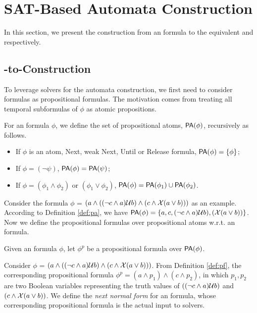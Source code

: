 \section{SAT-Based Automata Construction}\label{sec:main}

In this section, we present the construction from an \ltlf formula to the equivalent \NFA and \DFA respectively. 


\subsection{\ltlf-to-\NFA Construction}

To leverage \SAT solvers for the automata construction, we first need to consider \ltlf formulas as propositional formulas. The motivation comes from treating all temporal subformulas of $\phi$ as atomic propositions. 

\begin{definition}\label{def:pa}
For an \ltlf formula $\phi$, we define the set of propositional atoms, ${\sf PA}(\phi)$, recursively as follows.
\begin{itemize}
	\item If $\phi$ is an atom, Next, weak Next, Until or Release formula, ${\sf PA}(\phi)=\{\phi\}$;
	\item If $\phi = (\neg \psi)$, ${\sf PA}(\phi)= {\sf PA}(\psi)$;
	\item If $\phi = (\phi_1 \wedge \phi_2)$ or $(\phi_1 \vee \phi_2)$, ${\sf PA}(\phi) = {\sf PA}(\phi_1) \cup {\sf PA}(\phi_2)$.
\end{itemize}
\end{definition}

Consider the formula $\phi$ = $(a \wedge ((\neg c \wedge a)\mathcal{U} b) \wedge (c \wedge \mathcal{X} (a \vee b)))$ as an example. According to Definition \ref{def:pa}, we have ${\sf PA}(\phi)=\{a, c, (\neg c \wedge a)\mathcal{U} b), (\mathcal{X} (a \vee b))\}$. Now we define the propositional formulas over propositional atoms w.r.t. an \ltlf formula.

\begin{definition}\label{def:pf}
Given an \ltlf formula $\phi$, let $\phi^{p}$ be a propositional formula over ${\sf PA}(\phi)$. 
\end{definition}

Consider $\phi$ = $(a \wedge ((\neg c \wedge a)\mathcal{U} b) \wedge (c \wedge \mathcal{X} (a \vee b)))$. From Definition \ref{def:pf}, the corresponding propositional formula $\phi^p = (a \wedge p_1) \wedge (c \wedge p_2)$, in which $p_1, p_2$ are two Boolean variables representing the truth values of $((\neg c \wedge a)\mathcal{U} b)$ and $(c \wedge \mathcal{X} (a \vee b))$. We define the \emph{next normal form} for an \ltlf formula, whose corresponding propositional formula is the actual input to \SAT solvers.

